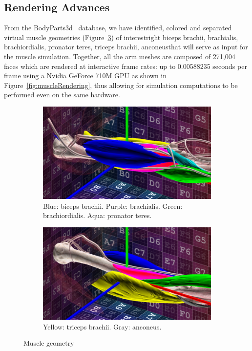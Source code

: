 \subsection{Rendering Advances}

From the BodyParts3d~\citep{bodyParts3d} database, we have identified, colored and separated virtual muscle geometries (Figure~\ref{fig:muscleView}) of interest\textemdash right biceps brachii, brachialis, brachiordialis, pronator teres, triceps brachii, anconeus\textemdash that will serve as input for the muscle simulation. Together, all the arm meshes are composed of 271,004 faces which are rendered at interactive frame rates: up to 0.00588235 seconds per frame using a Nvidia GeForce 710M GPU as shown in Figure~\ref{fig:muscleRendering}, thus allowing for simulation computations to be performed even on the same hardware.

\begin{figure}[t]
    \centering
    \begin{subfigure}[t]{0.45\textwidth}
        \centering
        \includegraphics[width=\textwidth]{./Figures/musclesFront.jpg}
        \caption{Blue: biceps brachii. Purple: brachialis. Green: brachiordialis. Aqua: pronator teres.}
        \label{fig:musclesFront}
    \end{subfigure}
\hfill
    \begin{subfigure}[t]{0.45\textwidth}
        \centering
        \includegraphics[width=\textwidth]{./Figures/musclesBack.jpg}
        \caption{Yellow: triceps brachii. Gray: anconeus.}
        \label{fig:musclesBack}
    \end{subfigure}

    \caption{Muscle geometry}
    \label{fig:muscleView}
\end{figure}

